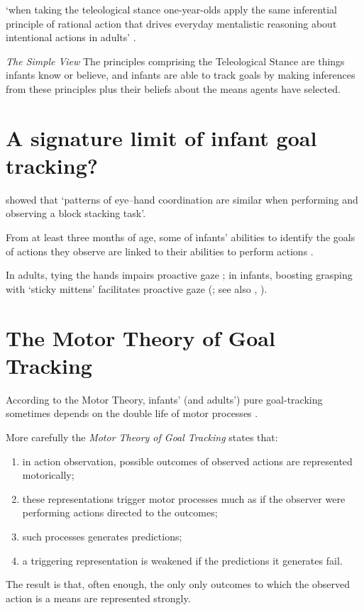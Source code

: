 \documentclass[12pt]{extarticle}
\begin{document}
\begin{multicols*}{3}
‘when taking the teleological stance one-year-olds apply the same
inferential principle of rational action that drives everyday mentalistic
reasoning about intentional actions in adults’ \citep{Csibra:2003kp}.
 
 
 \emph{The Simple View}
The principles comprising the Teleological Stance are things infants know or believe, and infants are
able to track goals by making inferences from these principles plus their beliefs about the means
agents have selected.
 


\section{A signature limit of infant goal tracking?}
 
\citet{Flanagan:2003lm} showed that
‘patterns of eye–hand coordination are similar when performing and observing a block stacking task’.
 
From at least three months of age, some of infants’ abilities to identify
the goals of actions they observe are linked to their abilities to perform
actions \citep{woodward:2009_infants}.
 
In adults, tying the hands impairs proactive gaze \citep{ambrosini:2012_tie}; in
infants, boosting grasping with ‘sticky mittens’ facilitates proactive gaze
(\citealp{sommerville:2005_action}; see also \citealp{sommerville:2008_experience},
\citealp{ambrosini:2013_looking, skerry:2013_firstperson}).
 
 
 
\section{The Motor Theory of Goal Tracking}
 

According to the  Motor Theory, infants’ (and adults’) pure goal-tracking sometimes depends on the double life of motor processes  \citep[see][for details]{sinigaglia:2015_puzzle}.
 
More carefully the \emph{Motor Theory of Goal Tracking} states that:
\begin{enumerate}
\item in action observation, possible outcomes of observed actions are represented motorically;
\item these representations trigger motor processes much as if the observer were performing actions directed to the outcomes;
\item such processes generates predictions;
\item a triggering representation is weakened if the predictions it generates fail.
\end{enumerate}
The result is that, often enough, the only only outcomes to which the observed action is a means
are represented strongly.
 

\end{multicols*}
\end{document}
